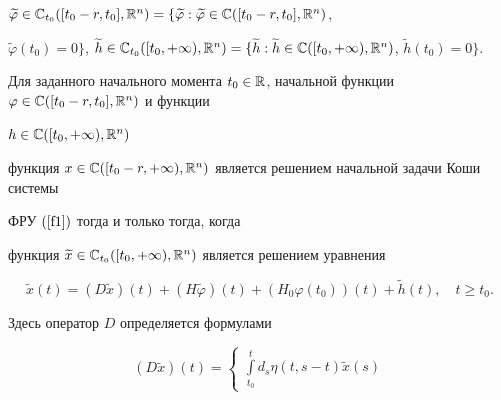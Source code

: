 $\widetilde{\varphi


}\in\Bbb{C}_{t_{0}} ([t_{0}-r,t_{0}],\Bbb{R}


^{n})=\{ \widetilde{\varphi}: \widetilde{\varphi}\in


\Bbb{C} ([t_{0}-r,t_{0}],\Bbb{R}^{n})$,


$\widetilde{\varphi} (t_{0})=0 \} $, $\widetilde


{h}\in\Bbb{C}_{t_{0}} ([t_{0},+\infty),\Bbb{R}


^{n})=\{ \widetilde{h}: \widetilde{h}\in\Bbb{C} (


[t_{0},+\infty),\Bbb{R}^{n})$, $\widetilde


{h} (t_{0})=0 \} $.





\begin{assrts}


Для заданного начального момента $t_{0}


\in\Bbb{R}$, начальной функции $\varphi\in\Bbb{C} (


[t_{0}-r,t_{0}],\Bbb{R}^{n}) $ и функции


$h\in\Bbb{C} ([t_{0},+\infty),\Bbb{R}^{n})$


функция $x\in\Bbb{C} ([t_{0}-r,+\infty)


,\Bbb{R}^{n})$ является решением начальной задачи Коши системы


ФРУ $(\ref{f1})$ тогда и только тогда, когда


функция $\widetilde{x}\in\Bbb{C}_{t_{0}} ([t_{0},+\infty),


\Bbb{R}^{n})$ является решением уравнения 


\begin{equation}


\widetilde{x} (t)=(D\widetilde{x}) (


t) + (H\widetilde{\varphi}) (t) + (


H_{0}\varphi (t_{0})) (t) +\widetilde


{h} (t),\quad t\geq t_{0}.\label{ur_oper_1}


\end{equation}


Здесь оператор $D$ определяется формулами


\begin{equation}


(D\widetilde{x}) (t)=


\begin{cases}


\int\limits_{t_{0}}^{t}d_{s}\eta (t,s-t) \widetilde{x} (s)



\end{cases}
\end{equation}
\end{assrts}
